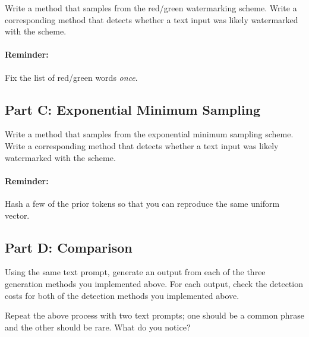 \documentclass{article}
\begin{document}
Write a method that samples from the red/green watermarking scheme.
Write a corresponding method that detects whether a text input was likely watermarked with the scheme.

\paragraph{Reminder:} Fix the list of red/green words \textit{once}.

\subsection*{Part C: Exponential Minimum Sampling}

Write a method that samples from the exponential minimum sampling scheme.
Write a corresponding method that detects whether a text input was likely watermarked with the scheme.

\paragraph{Reminder:} Hash a few of the prior tokens so that you can reproduce the same uniform vector.

\subsection*{Part D: Comparison}

Using the same text prompt, generate an output from each of the three generation methods you implemented above.
For each output, check the detection costs for both of the detection methods you implemented above.

Repeat the above process with two text prompts; one should be a common phrase and the other should be rare. What do you notice?

%
\end{document}
